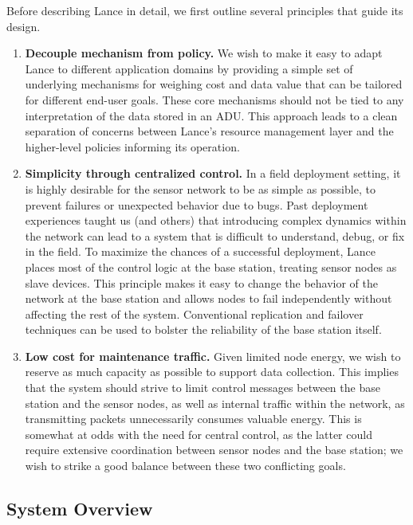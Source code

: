 Before describing Lance in detail, we first outline several principles
that guide its design.

\begin{enumerate}

\item \textbf{Decouple mechanism from policy.} We wish to make it easy to
adapt Lance to different application domains by providing a simple set of
underlying mechanisms for weighing cost and data value that can be tailored
for different end-user goals. These core mechanisms should not be tied to any
interpretation of the data stored in an ADU. This approach leads to a clean
separation of concerns between Lance's resource management layer and the
higher-level policies informing its operation.

\item \textbf{Simplicity through centralized control.} In a field deployment
setting, it is highly desirable for the sensor network to be as simple as
possible, to prevent failures or unexpected behavior due to bugs. Past
deployment experiences taught us (and others) that introducing complex
dynamics within the network can lead to a system that is difficult to
understand, debug, or fix in the field. To maximize the chances of a
successful deployment, Lance places most of the control logic at the base
station, treating sensor nodes as slave devices. This principle makes it easy
to change the behavior of the network at the base station and allows nodes to
fail independently without affecting the rest of the system. Conventional
replication and failover techniques can be used to bolster the reliability of
the base station itself.

\item \textbf{Low cost for maintenance traffic.} Given limited node energy,
we wish to reserve as much capacity as possible to support data collection.
This implies that the system should strive to limit control messages between
the base station and the sensor nodes, as well as internal traffic within the
network, as transmitting packets unnecessarily consumes valuable energy.
This is somewhat at odds with the need for central control, as the latter
could require extensive coordination between sensor nodes and the base
station; we wish to strike a good balance between these two conflicting
goals.

\end{enumerate}

\subsection{System Overview}

